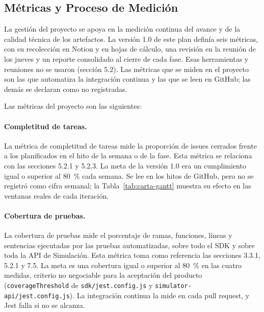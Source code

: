 \subsection{Métricas y Proceso de Medición}

La gestión del proyecto se apoya en la medición continua del avance y de la calidad técnica de los artefactos. La versión 1.0 de este plan definía seis métricas, con su recolección en Notion y en hojas de cálculo, una revisión en la reunión de los jueves y un reporte consolidado al cierre de cada fase. Esas herramientas y reuniones no se usaron (sección 5.2). Las métricas que se miden en el proyecto son las que automatiza la integración continua y las que se leen en GitHub; las demás se declaran como no registradas.

Las métricas del proyecto son las siguientes:

\paragraph{Completitud de tareas.}
La métrica de completitud de tareas mide la proporción de issues cerrados frente a los planificados en el hito de la semana o de la fase. Esta métrica se relaciona con las secciones 5.2.1 y 5.2.3. La meta de la versión 1.0 era un cumplimiento igual o superior al 80~\% cada semana. Se lee en los hitos de GitHub, pero no se registró como cifra semanal; la Tabla~\ref{tab:carta-gantt} muestra su efecto en las ventanas reales de cada iteración.

\paragraph{Cobertura de pruebas.}
La cobertura de pruebas mide el porcentaje de ramas, funciones, líneas y sentencias ejecutadas por las pruebas automatizadas, sobre todo el SDK y sobre toda la API de Simulación. Esta métrica toma como referencia las secciones 3.3.1, 5.2.1 y 7.5. La meta es una cobertura igual o superior al 80~\% en las cuatro medidas, criterio no negociable para la aceptación del producto (\texttt{coverageThreshold} de \texttt{sdk/jest.config.js} y \texttt{simulator-api/jest.config.js}). La integración continua la mide en cada pull request, y Jest falla si no se alcanza.

